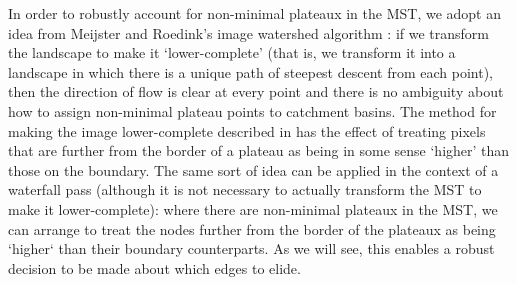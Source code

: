 \documentclass[a4paper]{article}
\begin{document}
In order to robustly account for non-minimal plateaux in the MST, we adopt an idea from Meijster and Roedink's image watershed algorithm \cite{meijster98}: if we transform the landscape to make it `lower-complete' (that is, we transform it into a landscape in which there is a unique path of steepest descent from each point), then the direction of flow is clear at every point and there is no ambiguity about how to assign non-minimal plateau points to catchment basins. The method for making the image lower-complete described in \cite{meijster98} has the effect of treating pixels that are further from the border of a plateau as being in some sense `higher' than those on the boundary. The same sort of idea can be applied in the context of a waterfall pass (although it is not necessary to actually transform the MST to make it lower-complete): where there are non-minimal plateaux in the MST, we can arrange to treat the nodes further from the border of the plateaux as being `higher` than their boundary counterparts. As we will see, this enables a robust decision to be made about which edges to elide.
\end{document}
